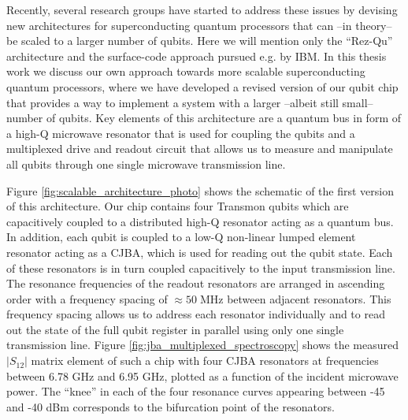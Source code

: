 Recently, several research groups have started to address these issues by devising new architectures for superconducting quantum processors that can --in theory-- be scaled to a larger number of qubits. Here we will mention only the ``Rez-Qu'' architecture \citep{galiautdinov_resonatorzero-qubit_2012} and the surface-code approach \citep{divincenzo_fault-tolerant_2009} pursued e.g. by IBM. In this thesis work we discuss our own approach towards more scalable superconducting quantum processors, where we have developed a revised version of our qubit chip that provides a way to implement a system with a larger --albeit still small-- number of qubits. Key elements of this architecture are a quantum bus in form of a high-Q microwave resonator that is used for coupling the qubits and a multiplexed drive and readout circuit that allows us to measure and manipulate all qubits through one single microwave transmission line. 

Figure \ref{fig:scalable_architecture_photo} shows the schematic of the first version of this architecture. Our chip contains four Transmon qubits which are capacitively coupled to a distributed high-Q resonator acting as a quantum bus. In addition, each qubit is coupled to a low-Q non-linear lumped element resonator acting as a CJBA, which is used for reading out the qubit state. Each of these resonators is in turn coupled capacitively to the input transmission line. The resonance frequencies of the readout resonators are arranged in ascending order with a frequency spacing of \mbox{$\approx 50\;\mathrm{MHz}$} between adjacent resonators. This frequency spacing allows us to address each resonator individually and to read out the state of the full qubit register in parallel using only one single transmission line. Figure \ref{fig:jba_multiplexed_spectroscopy} shows the measured $|S_{12}|$ matrix element of such a chip with four CJBA resonators at frequencies between 6.78 GHz and 6.95 GHz, plotted as a function of the incident microwave power. The ``knee'' in each of the four resonance curves appearing between -45 and -40 dBm corresponds to the bifurcation point of the resonators.

